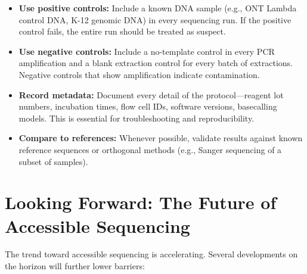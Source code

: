 \begin{itemize}[itemsep=2pt]
  \item \textbf{Use positive controls:} Include a known DNA sample (e.g., \acrshort{ONT} Lambda control DNA,  K-12 genomic DNA) in every sequencing run. If the positive control fails, the entire run should be treated as suspect.
  \item \textbf{Use negative controls:} Include a no-template control in every \acrshort{PCR} amplification and a blank extraction control for every batch of extractions. Negative controls that show amplification indicate contamination.
  \item \textbf{Record metadata:} Document every detail of the protocol---reagent lot numbers, incubation times, flow cell IDs, software versions, basecalling models. This is essential for troubleshooting and reproducibility.
  \item \textbf{Compare to references:} Whenever possible, validate results against known reference sequences or orthogonal methods (e.g., Sanger sequencing of a subset of samples).
\end{itemize}

\section{Looking Forward: The Future of Accessible Sequencing}
\label{sec:accessible:future}

The trend toward accessible sequencing is accelerating. Several developments on the horizon will further lower barriers:


